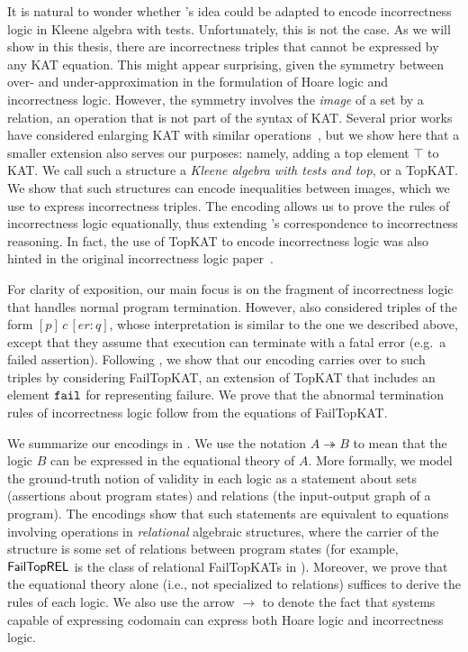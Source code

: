 It is natural to wonder whether \citeauthor{Kozen_2000}'s idea could be
adapted to encode incorrectness logic in Kleene algebra with tests.
Unfortunately, this is not the case. As we will show in this thesis, there are
incorrectness triples that cannot be expressed by any KAT equation.  This might
appear surprising, given the symmetry between over- and under-approximation in
the formulation of Hoare logic and incorrectness logic.  However, the symmetry
involves the \emph{image} of a set by a relation, an operation that is not part
of the syntax of KAT\@.  Several prior works have considered enlarging KAT with
similar
operations~\cite{Desharnais_Möller_Struth_2004,Fahrenberg_Johansen_Struth_Ziemiánski_2021,Desharnais_Möller_Struth_2006},
but we show here that a smaller extension also serves our purposes: namely,
adding a top element \(\top\) to KAT\@.   We call such a structure a \emph{Kleene
  algebra with tests and top}, or a TopKAT\@.  We show that such structures can
encode inequalities between images, which we use to express incorrectness
triples.  The encoding allows us to prove the rules of incorrectness logic
equationally, thus extending \citeauthor{Kozen_2000}'s correspondence to
incorrectness reasoning. In fact, the use of TopKAT to encode incorrectness logic was also hinted in the original incorrectness logic paper~\cite{OHearn_2020}.

For clarity of exposition, our main focus is on the fragment of incorrectness
logic that handles normal program termination.  However,
\citet{OHearn_2020} also considered triples of the form
\([p]\, c\, [er: q]\), whose interpretation is similar to the one we described
above, except that they assume that execution can terminate with a fatal error
(e.g.\ a failed assertion).  Following \citet{Mamouras_2017}, we show
that our encoding carries over to such triples by considering FailTopKAT, an
extension of TopKAT that includes an element \(\mathtt{fail}\) for representing failure.
We prove that the abnormal termination rules of incorrectness logic follow from
the equations of FailTopKAT\@.

We summarize our encodings in .  We
use the notation \(A ↠ B\) to mean that the logic \(B\) can be
expressed in the equational theory of \(A\).  More formally, we model the
ground-truth notion of validity in each logic as a statement about sets
(assertions about program states) and relations (the input-output graph of a
program).  The encodings show that such statements are equivalent to equations
involving operations in \emph{relational} algebraic structures, where the
carrier of the structure is some set of relations between program states (for
example, \(\mathsf{FailTopREL}\) is the class of relational FailTopKATs in
).  Moreover, we prove that the equational
theory alone (i.e., not specialized to relations) suffices to derive the rules
of each logic.  We also use the arrow \(\to\) to denote the fact that 
systems capable of expressing codomain can express both Hoare logic and incorrectness logic.

